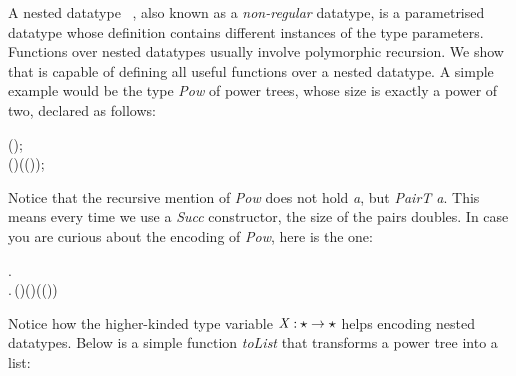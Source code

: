 A nested datatype~\cite{nesteddt}  ,
also known as a \emph{non-regular} datatype, is a parametrised
datatype whose definition contains different instances of the type
parameters. Functions over nested datatypes usually involve
polymorphic recursion. We show that \sufcc is capable of defining all
useful functions over a nested datatype. A simple example would be the
type \emph{Pow} of power trees, whose size is exactly a power of two,
declared as follows:
\begin{hscode}\SaveRestoreHook
{}%
%
%
\>[3]{}\;\;(\mathbin{:}\star)\mathrel{=}\;\;;{}\<[E]%
\\
\>[3]{}\;\;(\mathbin{:}\star)\mathrel{=}\;\mid {}\;(\;(\;));{}\<[E]%
\ColumnHook
\end{hscode}\resethooks
Notice that the recursive mention of \emph{Pow} does not hold
\emph{a}, but \emph{PairT a}. This means every time we use a
\emph{Succ} constructor, the size of the pairs doubles. In case you
are curious about the encoding of \emph{Pow}, here is the one:
\begin{hscode}\SaveRestoreHook
{}%
%
%
%
\>[3]{}\;\mathbin{:}\star\to \star\mathrel{=}\;\mathbin{:}\star\to \star.\,{}\<[E]%
\\
\>[3]{}\<[7]%
\>[7]{}\lambda {}\mathbin{:}\star.\,(\mathbin{:}\star)\to (\to {})\to (\;(\;)\to {})\to {}\<[E]%
\ColumnHook
\end{hscode}\resethooks
Notice how the higher-kinded type variable \ensuremath{\Conid{X}\mathbin{:}\star\to \star} helps encoding
nested datatypes. Below is a simple function \emph{toList} that
transforms a power tree into a list:
